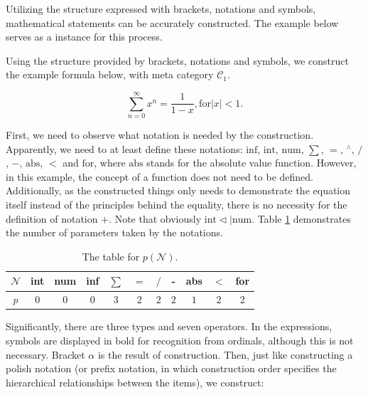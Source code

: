 \documentclass{aims}
\numberwithin{equation}{section}
\numberwithin{theorem}{section}	%
\numberwithin{axiom}{section}	%
\numberwithin{definition}{section}	%
\begin{document}
	Utilizing the structure expressed with brackets, notations and symbols, mathematical statements can be accurately constructed. The example below serves as a instance for this process.
	
	Using the structure provided by brackets, notations and symbols, we construct the example formula below, with meta category \(\mathcal{C}_1\).
	
	\begin{equation*}
		\sum _{n=0}^{\infty } x^n=\frac{1}{1-x}, \text{for} |x|<1.
	\end{equation*}
	
	First, we need to observe what notation is needed by the construction. Apparently, we need to at least define these notations: \(\text{inf}\), \(\text{int}\), \(\text{num}\),\textit{  }\textit{ \(\sum\)}, \(=\), \({}^{\wedge}\), \(/\), \(-\), \(\text{abs}\), \(<\) and \(\text{for}\), where \(\text{abs}\) stands for the absolute value function. However, in this example, the concept of a function does not need to be defined. Additionally, as the constructed things only needs to demonstrate the equation itself instead of the principles behind the equality, there is no necessity for the definition of notation \(+\). Note that obviously \(\text{int} \triangleleft | \text{num}\). Table  \ref{table-1} demonstrates the number of parameters taken by the notations.
	
	\begin{table}[h]
		\centering
		\caption{The table for $\mathit{p}(\mathcal{N})$.}
		\begin{tabular}{ccccccccccc}
			\toprule
			$\mathcal{N}$ & int & num & inf & $\sum$ & $=$ & $/$ & - & abs & $<$ & for \\
			\midrule
			$\mathit{p}$ & $0$ & $0$ & $0$ & $3$ & $2$ & $2$ & $2$ & $1$ & $2$ & $2$ \\
			\bottomrule
		\end{tabular}
		\label{table-1}
	\end{table}
	
	Significantly, there are three types and seven operators. In the expressions, symbols are displayed in bold for recognition from ordinals, although this
	is not necessary. Bracket \(\alpha\) is the result of construction. Then, just like constructing a polish notation (or prefix notation, in which construction order specifies the hierarchical relationships between the items), we construct:
	
\end{document}
